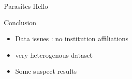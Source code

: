 \documentclass[10pt]{beamer}
\begin{document}
\begin{frame}{Parasites}
  Hello
  \end{frame}

\begin{frame}{Conclusion}
  \begin{itemize}
    \item Data issues : no institution affiliations
    \item very heterogenous dataset
    \item Some suspect results
  \end{itemize}
  \end{frame}

%    
%    
%    
%
%
%
\end{document}
